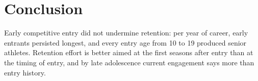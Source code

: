\documentclass[12pt,a4paper]{article}
\begin{document}
\section{Conclusion}

Early competitive entry did not undermine retention: per year of career, early entrants persisted longest, and every entry age from 10 to 19 produced senior athletes. Retention effort is better aimed at the first seasons after entry than at the timing of entry, and by late adolescence current engagement says more than entry history.



\end{document}
